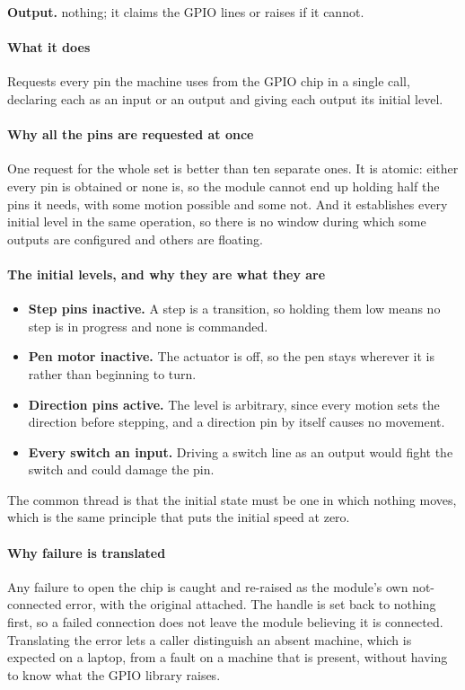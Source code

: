 \noindent\textbf{Output.} nothing; it claims the GPIO lines or raises if it cannot.


\paragraph{What it does}
Requests every pin the machine uses from the GPIO chip in a single call, declaring each as an input or an output and giving each output its initial level.


\paragraph{Why all the pins are requested at once}
One request for the whole set is better than ten separate ones. It is atomic: either every pin is obtained or none is, so the module cannot end up holding half the pins it needs, with some motion possible and some not. And it establishes every initial level in the same operation, so there is no window during which some outputs are configured and others are floating.


\paragraph{The initial levels, and why they are what they are}

\begin{itemize}\setlength\itemsep{0pt}
  \item \textbf{Step pins inactive.} A step is a transition, so holding them low means no step is in progress and none is commanded.
  \item \textbf{Pen motor inactive.} The actuator is off, so the pen stays wherever it is rather than beginning to turn.
  \item \textbf{Direction pins active.} The level is arbitrary, since every motion sets the direction before stepping, and a direction pin by itself causes no movement.
  \item \textbf{Every switch an input.} Driving a switch line as an output would fight the switch and could damage the pin.
\end{itemize}
The common thread is that the initial state must be one in which nothing moves, which is the same principle that puts the initial speed at zero.


\paragraph{Why failure is translated}
Any failure to open the chip is caught and re-raised as the module's own not-connected error, with the original attached. The handle is set back to nothing first, so a failed connection does not leave the module believing it is connected. Translating the error lets a caller distinguish an absent machine, which is expected on a laptop, from a fault on a machine that is present, without having to know what the GPIO library raises.


